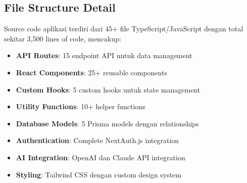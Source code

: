 \subsection{File Structure Detail}

Source code aplikasi terdiri dari 45+ file TypeScript/JavaScript dengan total sekitar 3,500 lines of code, mencakup:

\begin{itemize}
\item \textbf{API Routes}: 15 endpoint API untuk data management
\item \textbf{React Components}: 25+ reusable components
\item \textbf{Custom Hooks}: 5 custom hooks untuk state management
\item \textbf{Utility Functions}: 10+ helper functions
\item \textbf{Database Models}: 5 Prisma models dengan relationships
\item \textbf{Authentication}: Complete NextAuth.js integration
\item \textbf{AI Integration}: OpenAI dan Claude API integration
\item \textbf{Styling}: Tailwind CSS dengan custom design system
\end{itemize}